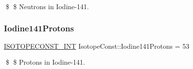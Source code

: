 \$ \$ Neutrons in Iodine-\/141. \mbox{\label{group___isotope_const-_iodine-_i141_ga168cf300fa42e3e33d8f031062330108}} 
\subsubsection{\texorpdfstring{Iodine141\+Protons}{Iodine141Protons}}
{\footnotesize\ttfamily \mbox{\hyperlink{group___isotope_const-_macros_ga5f18360b3e99483a35c32d789e62621c}{I\+S\+O\+T\+O\+P\+E\+C\+O\+N\+S\+T\+\_\+\+I\+NT}} Isotope\+Const\+::\+Iodine141\+Protons = 53}

\$ \$ Protons in Iodine-\/141. 